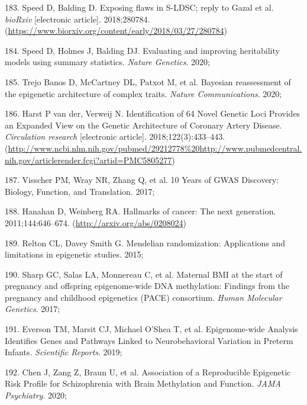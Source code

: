 \documentclass[11pt,oneside]{bristolthesis}
\newenvironment{cslreferences}%
  {}%
  {\par}
\begin{document}
\begin{cslreferences}
\leavevmode\hypertarget{ref-Speed2018}{}%
183. Speed D, Balding D. Exposing flaws in S-LDSC; reply to Gazal et al. \emph{bioRxiv} {[}electronic article{]}. 2018;280784. (\url{https://www.biorxiv.org/content/early/2018/03/27/280784})

\leavevmode\hypertarget{ref-Speed2020}{}%
184. Speed D, Holmes J, Balding DJ. Evaluating and improving heritability models using summary statistics. \emph{Nature Genetics}. 2020;

\leavevmode\hypertarget{ref-TrejoBanos2020}{}%
185. Trejo Banos D, McCartney DL, Patxot M, et al. Bayesian reassessment of the epigenetic architecture of complex traits. \emph{Nature Communications}. 2020;

\leavevmode\hypertarget{ref-VanderHarst2018}{}%
186. Harst P van der, Verweij N. Identification of 64 Novel Genetic Loci Provides an Expanded View on the Genetic Architecture of Coronary Artery Disease. \emph{Circulation research} {[}electronic article{]}. 2018;122(3):433--443. (\url{http://www.ncbi.nlm.nih.gov/pubmed/29212778\%20http://www.pubmedcentral.nih.gov/articlerender.fcgi?artid=PMC5805277})

\leavevmode\hypertarget{ref-Visscher2017}{}%
187. Visscher PM, Wray NR, Zhang Q, et al. 10 Years of GWAS Discovery: Biology, Function, and Translation. 2017;

\leavevmode\hypertarget{ref-Hanahan2011}{}%
188. Hanahan D, Weinberg RA. Hallmarks of cancer: The next generation. 2011;144:646--674. (\url{http://arxiv.org/abs/0208024})

\leavevmode\hypertarget{ref-Relton2015}{}%
189. Relton CL, Davey Smith G. Mendelian randomization: Applications and limitations in epigenetic studies. 2015;

\leavevmode\hypertarget{ref-Sharp2017}{}%
190. Sharp GC, Salas LA, Monnereau C, et al. Maternal BMI at the start of pregnancy and offspring epigenome-wide DNA methylation: Findings from the pregnancy and childhood epigenetics (PACE) consortium. \emph{Human Molecular Genetics}. 2017;

\leavevmode\hypertarget{ref-Everson2019}{}%
191. Everson TM, Marsit CJ, Michael O'Shea T, et al. Epigenome-wide Analysis Identifies Genes and Pathways Linked to Neurobehavioral Variation in Preterm Infants. \emph{Scientific Reports}. 2019;

\leavevmode\hypertarget{ref-Chen2020}{}%
192. Chen J, Zang Z, Braun U, et al. Association of a Reproducible Epigenetic Risk Profile for Schizophrenia with Brain Methylation and Function. \emph{JAMA Psychiatry}. 2020;


\end{cslreferences}
\end{document}
